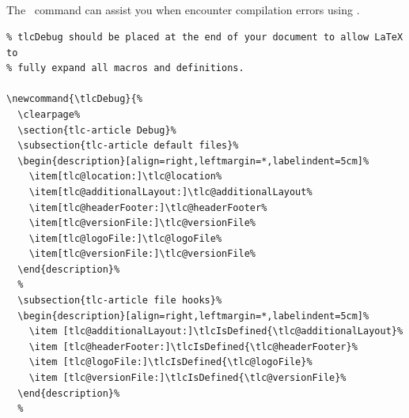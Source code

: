 \documentclass[12pt]{tlc-article}
\begin{document}

\subsection{\tlcDebug}
The \tlcDebug\ command can  assist you when encounter compilation errors using
\tlcA.

\tlcVspace

\begin{lstlisting}[basicstyle=\tiny]
% We define tlcDebug to aid our users when they are debugging their document.
% tlcDebug should be placed at the end of your document to allow LaTeX to
% fully expand all macros and definitions.

\newcommand{\tlcDebug}{%
  \clearpage%
  \section{tlc-article Debug}%
  \subsection{tlc-article default files}%
  \begin{description}[align=right,leftmargin=*,labelindent=5cm]%
    \item[tlc@location:]\tlc@location%
    \item[tlc@additionalLayout:]\tlc@additionalLayout%
    \item[tlc@headerFooter:]\tlc@headerFooter%
    \item[tlc@versionFile:]\tlc@versionFile%
    \item[tlc@logoFile:]\tlc@logoFile%
    \item[tlc@versionFile:]\tlc@versionFile%
  \end{description}%
  %
  \subsection{tlc-article file hooks}%
  \begin{description}[align=right,leftmargin=*,labelindent=5cm]%
    \item [tlc@additionalLayout:]\tlcIsDefined{\tlc@additionalLayout}%
    \item [tlc@headerFooter:]\tlcIsDefined{\tlc@headerFooter}%
    \item [tlc@logoFile:]\tlcIsDefined{\tlc@logoFile}%
    \item [tlc@versionFile:]\tlcIsDefined{\tlc@versionFile}%
  \end{description}%
  %

\end{lstlisting}
\end{document}
